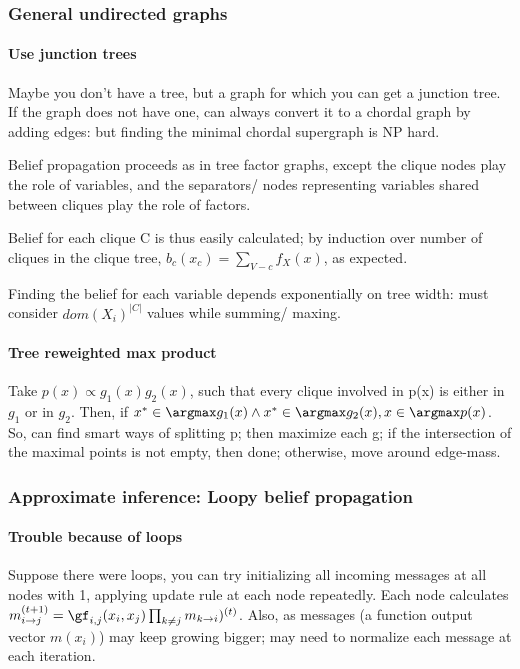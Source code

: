\documentclass[oneside, article]{memoir}
\begin{document}
\subsubsection{General undirected graphs}
\paragraph*{Use junction trees}
Maybe you don't have a tree, but a graph for which you can get a junction tree. If the graph does not have one, can always convert it to a chordal graph by adding edges: but finding the minimal chordal supergraph is NP hard.

Belief propagation proceeds as in tree factor graphs, except the clique nodes play the role of variables, and the separators/ nodes representing variables shared between cliques play the role of factors.

Belief for each clique C is thus easily calculated; by induction over number of cliques in the clique tree, $b_c(x_c) = \sum_{V - c} f_X(x)$, as expected.

Finding the belief for each variable depends exponentially on tree width: must consider $dom(X_i)^{|C|}$ values while summing/ maxing.

\paragraph*{Tree reweighted max product}
Take $p(x) \propto g_1(x)g_2(x)$, such that every clique involved in p(x) is either in $g_1$ or in $g_2$. Then, if $x^{*} \in \argmax g_1(x) \land x^{*} \in \argmax g_2(x), x \in \argmax p(x)$. So, can find smart ways of splitting p; then maximize each g; if the intersection of the maximal points is not empty, then done; otherwise, move around edge-mass.

\subsubsection{Approximate inference: Loopy belief propagation}
\paragraph*{Trouble because of loops}
Suppose there were loops, you can try initializing all incoming messages at all nodes with 1, applying update rule at each node repeatedly. Each node calculates $m_{i \to j}^{(t+1)} = \gf_{i,j}(x_i, x_j)\prod_{k \neq j}m_{k \to i})^{(t)}$.
Also, as messages (a function output vector $m(x_i)$) may keep growing bigger; may need to normalize each message at each iteration.
\end{document}
